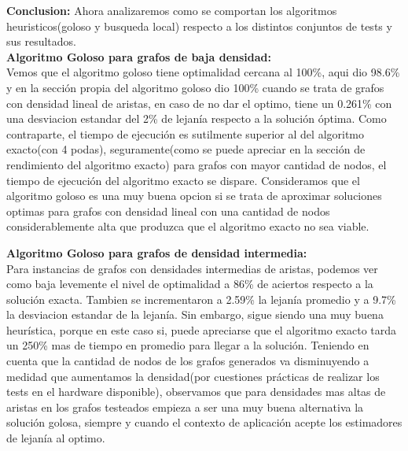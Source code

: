 \textbf{Conclusion: } Ahora analizaremos como se comportan los algoritmos heuristicos(goloso y busqueda local) respecto a los distintos conjuntos de tests y sus resultados.\\

\vspace{0.75cm}
\textbf{Algoritmo Goloso para grafos de baja densidad:}\\
Vemos que el algoritmo goloso tiene optimalidad cercana al 100\%, aqui dio 98.6\% y en la secci\'on propia del algoritmo goloso dio 100\% cuando se trata de grafos con densidad lineal de aristas, en caso de no dar el optimo, tiene un 0.261\% con una desviacion estandar del 2\% de lejan\'ia respecto a la soluci\'on \'optima. Como contraparte, el tiempo de ejecuci\'on es sutilmente superior al del algoritmo exacto(con 4 podas), seguramente(como se puede apreciar en la secci\'on de rendimiento del algoritmo exacto) para grafos con mayor cantidad de nodos, el tiempo de ejecuci\'on del algoritmo exacto se dispare. Consideramos que el algoritmo goloso es una muy buena opcion si se trata de aproximar soluciones optimas para grafos con densidad lineal con una cantidad de nodos considerablemente alta que produzca que el algoritmo exacto no sea viable.\\

\vspace{0.5cm}

\textbf{Algoritmo Goloso para grafos de densidad intermedia:}\\
Para instancias de grafos con densidades intermedias de aristas, podemos ver como baja levemente el nivel de optimalidad a 86\% de aciertos respecto a la soluci\'on exacta. Tambien se incrementaron a  2.59\% la lejan\'ia promedio y a 9.7\% la desviacion estandar de la lejan\'ia. Sin embargo, sigue siendo una muy buena heur\'istica, porque en este caso si, puede apreciarse que el algoritmo exacto tarda un 250\% mas de tiempo en promedio para llegar a la soluci\'on. Teniendo en cuenta que la cantidad de nodos de los grafos generados va disminuyendo a medidad que aumentamos la densidad(por cuestiones pr\'acticas de realizar los tests en el hardware disponible), observamos que para densidades mas altas de aristas en los grafos testeados empieza a ser una muy buena alternativa la soluci\'on golosa, siempre y cuando el contexto de aplicaci\'on acepte los estimadores de lejan\'ia al optimo.

\vspace{0.5cm}

